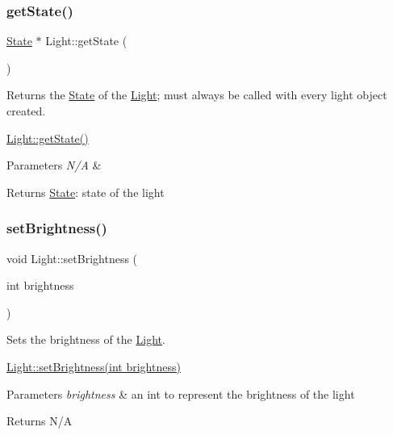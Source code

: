 \subsubsection{\texorpdfstring{get\+State()}{getState()}}
{\footnotesize\ttfamily \hyperlink{class_state}{State} $\ast$ Light\+::get\+State (\begin{DoxyParamCaption}{ }\end{DoxyParamCaption})}



Returns the \hyperlink{class_state}{State} of the \hyperlink{class_light}{Light}; must always be called with every light object created. 

\hyperlink{class_light_a287da1d58d038e10899c38f8464cbc22}{Light\+::get\+State()} 
\begin{DoxyParams}{Parameters}
{\em N/A} & \\
\hline
\end{DoxyParams}
\begin{DoxyReturn}{Returns}
\hyperlink{class_state}{State}\+: state of the light 
\end{DoxyReturn}
\mbox{\label{class_light_a95d42b02b50ea8f060be6efa0481ba3c}} 
\subsubsection{\texorpdfstring{set\+Brightness()}{setBrightness()}}
{\footnotesize\ttfamily void Light\+::set\+Brightness (\begin{DoxyParamCaption}\item[{int}]{brightness }\end{DoxyParamCaption})}



Sets the brightness of the \hyperlink{class_light}{Light}. 

\hyperlink{class_light_a95d42b02b50ea8f060be6efa0481ba3c}{Light\+::set\+Brightness(int brightness)} 
\begin{DoxyParams}{Parameters}
{\em brightness} & an int to represent the brightness of the light \\
\hline
\end{DoxyParams}
\begin{DoxyReturn}{Returns}
N/A 
\end{DoxyReturn}
\mbox{\label{class_light_addc99af8c89bfd9c0ebd8908bd290ba7}} 
